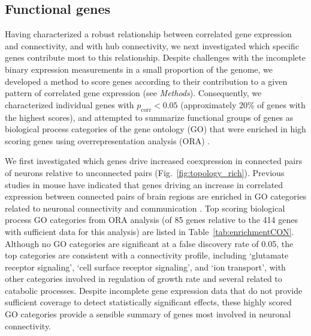 \documentclass[10pt,letterpaper]{article}
\begin{document}
{\subsection*{Functional genes}
Having characterized a robust relationship between correlated gene expression and connectivity, and with hub connectivity, we next investigated which specific genes contribute most to this relationship.
Despite challenges with the incomplete binary expression measurements in a small proportion of the genome, we developed a method to score genes according to their contribution to a given pattern of correlated gene expression (see \emph{Methods}).
Consequently, we characterized individual genes with $p_\mathrm{corr}<0.05$ (approximately 20\% of genes with the highest scores), and attempted to summarize functional groups of genes as biological process categories of the gene ontology (GO) that were enriched in high scoring genes using overrepresentation analysis (ORA) \cite{Ashburner2000, Gillis2010}.

We first investigated which genes drive increased coexpression in connected pairs of neurons relative to unconnected pairs (Fig.~\ref{fig:topology_rich}).
Previous studies in mouse have indicated that genes driving an increase in correlated expression between connected pairs of brain regions are enriched in GO categories related to neuronal connectivity and communication \cite{Fulcher:2016ck, Ji:2014jw, Fakhry:2015kl, French:2011cz}.
Top scoring biological process GO categories from ORA analysis (of 85 genes relative to the 414 genes with sufficient data for this analysis) are listed in Table~\ref{tab:enrichmentCON}.
Although no GO categories are significant at a false discovery rate of 0.05, the top categories are consistent with a connectivity profile, including `glutamate receptor signaling', `cell surface receptor signaling', and `ion transport', with other categories involved in regulation of growth rate and several related to catabolic processes.
Despite incomplete gene expression data that do not provide sufficient coverage to detect statistically significant effects, these highly scored GO categories provide a sensible summary of genes most involved in neuronal connectivity.

}
\end{document}
